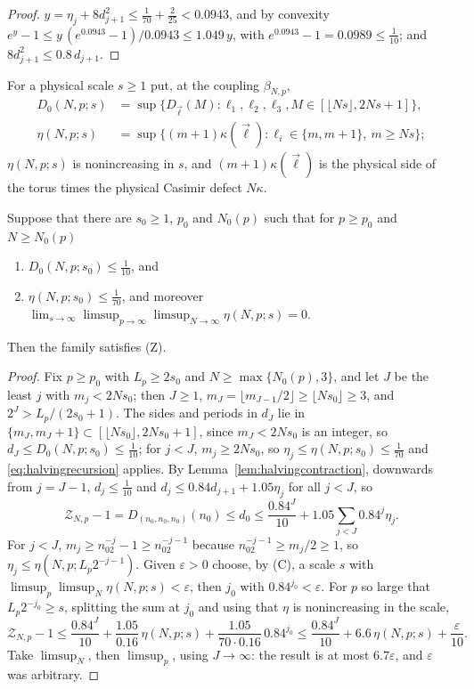 \begin{proof}
$y=\eta_j+8d_{j+1}^2\le\frac1{70}+\frac2{25}<0.0943$, and by convexity
$e^y-1\le y\,(e^{0.0943}-1)/0.0943\le1.049\,y$, with $e^{0.0943}-1=0.0989
\le\frac1{10}$; and $8d_{j+1}^2\le0.8\,d_{j+1}$.
\end{proof}

For a physical scale $s\ge1$ put, at the coupling $\beta_{N,p}$,
\begin{align*}
D_0(N,p;s)&=\sup\bigl\{D_{\vec\ell}(M):\ell_1,\ell_2,\ell_3,M\in[\lfloor Ns
\rfloor,2Ns+1]\bigr\},\\
\eta(N,p;s)&=\sup\bigl\{(m+1)\kappa(\vec\ell):\ell_i\in\{m,m+1\},\ m\ge Ns
\bigr\};
\end{align*}
$\eta(N,p;s)$ is nonincreasing in $s$, and $(m+1)\kappa(\vec\ell)$ is the
physical side of the torus times the physical Casimir defect $N\kappa$.

\begin{proposition}\label{prop:Zonescale}
Suppose that there are $s_0\ge1$, $p_0$ and $N_0(p)$ such that for $p\ge
p_0$ and $N\ge N_0(p)$
\begin{enumerate}[leftmargin=*]
\item[\textup{(Z$_0$)}] $D_0(N,p;s_0)\le\frac1{10}$, and
\item[\textup{(C)}] $\eta(N,p;s_0)\le\frac1{70}$, and moreover
$\displaystyle\lim_{s\to\infty}\limsup_{p\to\infty}\limsup_{N\to\infty}
\eta(N,p;s)=0$.
\end{enumerate}
Then the family satisfies \textup{(Z)}.
\end{proposition}

\begin{proof}
Fix $p\ge p_0$ with $L_p\ge2s_0$ and $N\ge\max\{N_0(p),3\}$, and let $J$ be
the least $j$ with $m_j<2Ns_0$; then $J\ge1$, $m_J=\lfloor m_{J-1}/2\rfloor
\ge\lfloor Ns_0\rfloor\ge3$, and $2^J>L_p/(2s_0+1)$. The sides and periods in
$d_J$ lie in $\{m_J,m_J+1\}\subset[\lfloor Ns_0\rfloor,2Ns_0+1]$, since $m_J<
2Ns_0$ is an integer, so $d_J\le D_0(N,p;s_0)\le\frac1{10}$;
for $j<J$, $m_j\ge2Ns_0$, so $\eta_j\le\eta(N,p;s_0)\le\frac1{70}$ and
\eqref{eq:halvingrecursion} applies. By Lemma~\ref{lem:halvingcontraction},
downwards from $j=J-1$, $d_j\le\frac1{10}$ and $d_j\le0.84d_{j+1}+1.05
\eta_j$ for all $j<J$, so
\[
\mathcal Z_{N,p}-1=D_{(n_0,n_0,n_0)}(n_0)\le d_0\le\frac{0.84^J}{10}+1.05
\sum_{j<J}0.84^j\eta_j .
\]
For $j<J$, $m_j\ge n_02^{-j}-1\ge n_02^{-j-1}$ because $n_02^{-j-1}\ge
m_j/2\ge1$, so $\eta_j\le\eta(N,p;L_p2^{-j-1})$. Given $\varepsilon>0$
choose, by (C), a scale $s$ with $\limsup_p\limsup_N\eta(N,p;s)<\varepsilon$,
then $j_0$ with $0.84^{j_0}<\varepsilon$. For $p$ so large that $L_p2^{-j_0}
\ge s$, splitting the sum at $j_0$ and using that $\eta$ is nonincreasing in
the scale,
\[
\mathcal Z_{N,p}-1\le\frac{0.84^J}{10}+\frac{1.05}{0.16}\,\eta(N,p;s)+
\frac{1.05}{70\cdot0.16}\,0.84^{j_0}\le\frac{0.84^J}{10}+6.6\,\eta(N,p;s)+
\frac{\varepsilon}{10}.
\]
Take $\limsup_N$, then $\limsup_p$, using $J\to\infty$: the result is at most
$6.7\varepsilon$, and $\varepsilon$ was arbitrary.
\end{proof}

